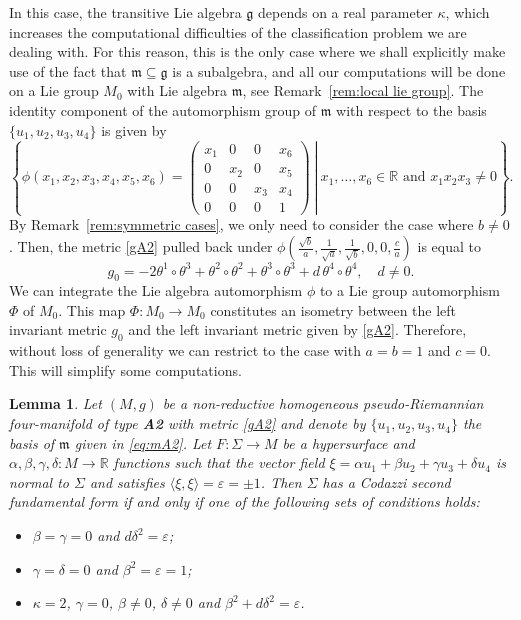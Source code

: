 \documentclass{amsart}
\theoremstyle{plain}
\newtheorem{lemma}{Lemma}
\theoremstyle{remark}
\def\R{\mathbb{R}}
\newcommand\g{{\mathfrak{g}}}
\newcommand\m{{\mathfrak{m}}}
\begin{document}
{In this case, the transitive Lie algebra $\g$ depends on a real parameter $\kappa$, which increases the computational difficulties of the classification problem we are dealing with. For this reason, this is the only case where we shall explicitly make use of the fact that 
$\m\subseteq \g$ is a subalgebra, and all our computations will be done on a Lie group $M_0$ with Lie algebra $\m$, see Remark~\ref{rem:local lie group}. 
The identity component of the automorphism group of $\m$ with respect to the basis $\{u_1,u_2,u_3,u_4\}$ is given by
\[
\left\{ \left. \phi(x_1,x_2,x_3,x_4,x_5,x_6)= \begin{pmatrix}
x_1 & 0 & 0 & x_6\\
0 & x_2 & 0 & x_5\\
0 & 0 & x_3 & x_4\\
0 & 0 & 0 & 1
\end{pmatrix} \ \right| \ x_1,\dots,x_6\in \R \mbox{ and } x_1x_2x_3 \neq 0 \right\}.
\]
By Remark~\ref{rem:symmetric cases}, we only need to consider the case where  $b\neq 0$. Then, the metric \eqref{gA2} pulled back under $\phi\left(\frac{\sqrt{b}}{a},\frac{1}{\sqrt{a}}, \frac{1}{\sqrt{b}}, 0, 0,\frac{c}{a}\right)$ is equal to
\begin{equation}\label{metA2}
g_0= -2\theta^1 \circ \theta^3+\theta^2 \circ \theta^2 + \theta^3 \circ \theta^3 +d\, \theta^4 \circ \theta^4, \quad d \neq 0.
\end{equation}
We can integrate the Lie algebra automorphism $\phi$ to a Lie group automorphism $\Phi$ of $M_0$. This map $\Phi:M_0\to M_0$ constitutes an isometry between the left invariant metric  $g_0$ and the left invariant metric given by \eqref{gA2}.
Therefore, without loss of generality we can restrict to the case with $a=b=1$ and $c=0$. This will simplify some computations.

\begin{lemma}\label{necA2}
Let $(M,g)$ be a non-reductive homogeneous pseudo-Riemannian four-manifold of type {\rm\bf A2} with metric \eqref{gA2} and denote by $\{u_1,u_2,u_3,u_4\}$ the basis of $\m$ given in \eqref{eq:mA2}. Let $F : \Sigma \to M$ be a hypersurface and $\alpha, \beta, \gamma, \delta : M \to \R$ functions such that the vector field $\xi=\alpha u_1+\beta u_2+\gamma u_3+\delta u_4$ is normal to $\Sigma$ and satisfies $\langle \xi,\xi \rangle =\varepsilon=\pm 1$. Then $\Sigma$ has a Codazzi second fundamental form if and only if one of the following sets of conditions holds: 
\begin{itemize}
\item[(i)] $\beta=\gamma=0$ and $d\delta^2=\varepsilon$;
\item[(ii)] $\gamma=\delta=0$ and $\beta^2=\varepsilon=1$;
\item[(iii)] $\kappa=2$, $\gamma=0$, $\beta \neq 0$, $\delta\neq 0$ and $\beta^2+d\delta^2=\varepsilon$. 
\end{itemize}
\end{lemma}

}
\end{document}
